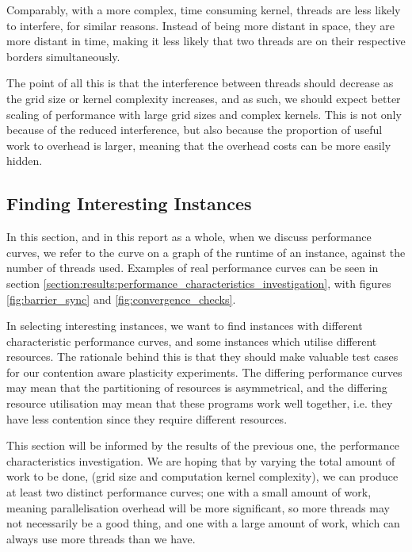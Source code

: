Comparably, with a more complex, time consuming kernel, threads are less likely to interfere, for similar reasons. Instead of being more distant in space, they are more distant in time, making it less likely that two threads are on their respective borders simultaneously. 

The point of all this is that the interference between threads should decrease as the grid size or kernel complexity increases, and as such, we should expect better scaling of performance with large grid sizes and complex kernels. This is not only because of the reduced interference, but also because the proportion of useful work to overhead is larger, meaning that the overhead costs can be more easily hidden.



\subsection{Finding Interesting Instances}
\label{section:design:interesting_instances}

In this section, and in this report as a whole, when we discuss performance curves, we refer to the curve on a graph of the runtime of an instance, against the number of threads used. Examples of real performance curves can be seen in section \ref{section:results:performance_characteristics_investigation}, with figures \ref{fig:barrier_sync} and \ref{fig:convergence_checks}.

In selecting interesting instances, we want to find instances with different characteristic performance curves, and some instances which utilise different resources. The rationale behind this is that they should make valuable test cases for our contention aware plasticity experiments. The differing performance curves may mean that the partitioning of resources is asymmetrical, and the differing resource utilisation may mean that these programs work well together, i.e. they have less contention since they require different resources.

This section will be informed by the results of the previous one, the performance characteristics investigation. We are hoping that by varying the total amount of work to be done, (grid size and computation kernel complexity), we can produce at least two distinct performance curves; one with a small amount of work, meaning parallelisation overhead will be more significant, so more threads may not necessarily be a good thing, and one with a large amount of work, which can always use more threads than we have.

